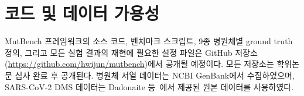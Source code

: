 \section*{코드 및 데이터 가용성}

MutBench 프레임워크의 소스 코드, 벤치마크 스크립트, 9종 병원체별 ground truth 정의, 그리고 모든 실험 결과의 재현에 필요한 설정 파일은 GitHub 저장소(\url{https://github.com/hwijun/mutbench})에서 공개될 예정이다.
모든 저장소는 학위논문 심사 완료 후 공개된다.
병원체 서열 데이터는 NCBI GenBank에서 수집하였으며, SARS-CoV-2 DMS 데이터는 Dadonaite 등~\cite{dadonaite2023dms}에서 제공된 원본 데이터를 사용하였다.

